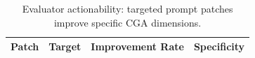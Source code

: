 \begin{table}[t]
\centering
\caption{Evaluator actionability: targeted prompt patches improve specific CGA dimensions.}
\label{tab:actionability}
\begin{tabular}{lccc}
\toprule
Patch & Target & Improvement Rate & Specificity \\
\midrule
\bottomrule
\end{tabular}
\end{table}